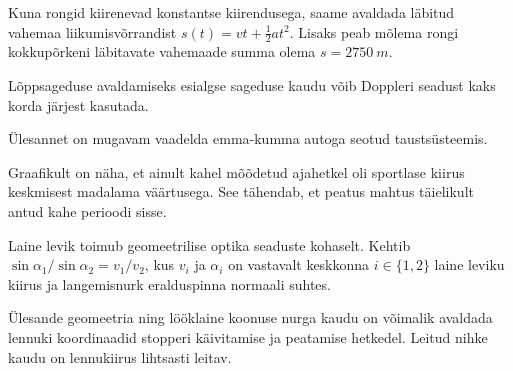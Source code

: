 \documentclass[10pt]{article}
\begin{document}
{%

\hint
Kuna rongid kiirenevad konstantse kiirendusega, saame avaldada läbitud vahemaa liikumisvõrrandist $s(t) = vt + \frac{1}{2}at^2$. Lisaks peab mõlema rongi kokkupõrkeni läbitavate vahemaade summa olema $s = \SI{2750}{m}$.
\probend
\bigskip


\hint
Lõppsageduse avaldamiseks esialgse sageduse kaudu võib Doppleri seadust kaks korda järjest kasutada.
\probend
\bigskip


\hint
Ülesannet on mugavam vaadelda emma-kumma autoga seotud taustsüsteemis.
\probend
\bigskip


\hint
Graafikult on näha, et ainult kahel mõõdetud ajahetkel oli sportlase kiirus keskmisest madalama väärtusega. See tähendab, et peatus mahtus täielikult antud kahe perioodi sisse.
\probend
\bigskip


\hint
Laine levik toimub geomeetrilise optika seaduste kohaselt. Kehtib $\sin \alpha_{1}/\sin \alpha_{2}=v_{1}/v_{2}$, kus $v_i$ ja $\alpha_i$ on vastavalt keskkonna $i\in \{1, 2\}$ laine leviku kiirus ja langemisnurk eralduspinna normaali suhtes.
\probend
\bigskip


\hint
Ülesande geomeetria ning lööklaine koonuse nurga kaudu on võimalik avaldada lennuki koordinaadid stopperi käivitamise ja peatamise hetkedel. Leitud nihke kaudu on lennukiirus lihtsasti leitav.
\probend
\bigskip


}
\end{document}
